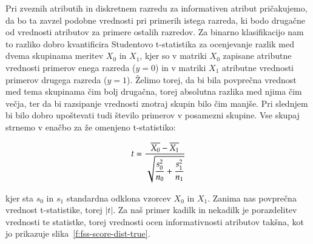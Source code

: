 \begin{figure}[htbp]
\end{figure}

Pri zveznih atributih in diskretnem razredu za informativen atribut pričakujemo, da bo ta zavzel podobne vrednosti pri primerih istega razreda, ki bodo drugačne od vrednosti atributov za primere ostalih razredov. Za binarno klasifikacijo nam to razliko dobro kvantificira Studentovo t-statistika za ocenjevanje razlik med dvema skupinama meritev $X_0$ in $X_1$, kjer so v matriki $X_0$ zapisane atributne vrednosti primerov enega razreda ($y=0$) in v matriki $X_1$ atributne vrednosti primerov drugega razreda ($y=1$). Želimo torej, da bi bila povprečna vrednost med tema skupinama čim bolj drugačna, torej absolutna razlika med njima čim večja, ter da bi razsipanje vrednosti znotraj skupin bilo čim manjše. Pri slednjem bi bilo dobro upoštevati tudi število primerov v posamezni skupine. Vse skupaj strnemo v enačbo za že omenjeno t-statistiko:

$$t=\frac{\overline{X_0}-\overline{X_1}}{\sqrt{\displaystyle\frac{s_0^2}{n_0}+\frac{s_1^2}{n_1}}}$$

kjer sta $s_0$ in $s_1$ standardna odklona vzorcev $X_0$ in $X_1$. Zanima nas povprečna vrednost t-statistike, torej $|t|$. Za naš primer kadilk in nekadilk je porazdelitev vrednosti te statistke, torej vrednosti ocen informativnosti atributov takšna, kot jo prikazuje slika~\ref{f:fss-score-dist-true}.


